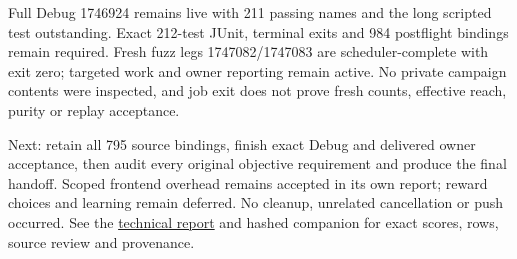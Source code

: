 \documentclass[11pt]{article}
\begin{document}
Full Debug 1746924 remains live with 211 passing names and the long scripted
test outstanding. Exact 212-test JUnit, terminal exits and 984 postflight
bindings remain required. Fresh fuzz legs 1747082/1747083 are scheduler-complete
with exit zero; targeted work and owner reporting remain active. No private
campaign contents were inspected, and job exit does not prove fresh counts,
effective reach, purity or replay acceptance.

Next: retain all 795 source bindings, finish exact Debug and delivered owner
acceptance, then audit every original objective requirement and produce the
final handoff. Scoped frontend overhead remains accepted in its own report;
reward choices and learning remain deferred. No cleanup, unrelated cancellation
or push occurred. See the
\href{../../benchmarks/reports/2026-10-03-shared-policy-regressions-recovered.md}{technical report}
and hashed companion for exact scores, rows, source review and provenance.
\end{document}
